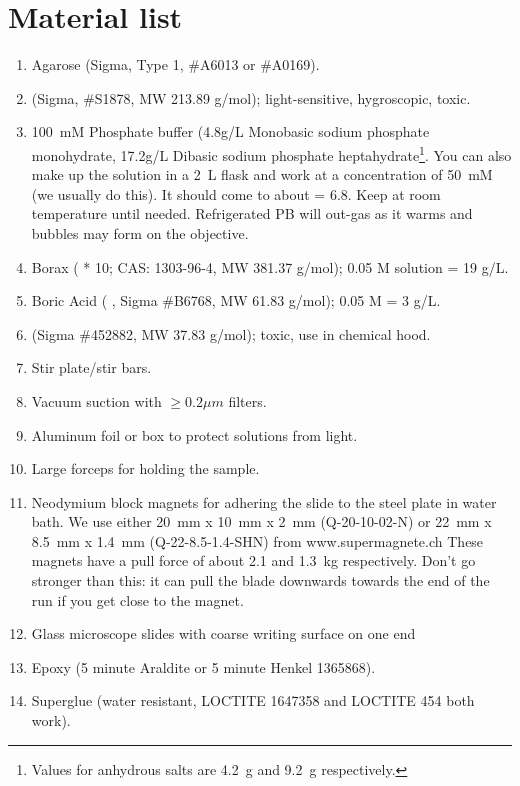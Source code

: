 \documentclass[paper=a4, fontsize=11pt]{scrartcl} %
\numberwithin{equation}{section} %
\numberwithin{figure}{section} %
\numberwithin{table}{section} %
\begin{document}
\section{Material list}
\begin{enumerate}
\item Agarose (Sigma, Type 1, \#A6013 or \#A0169).
\item {} (Sigma, \#S1878, MW 213.89 g/mol); light-sensitive, hygroscopic, toxic.
\item 100~mM Phosphate buffer (4.8g/L Monobasic sodium phosphate monohydrate, 17.2g/L Dibasic sodium phosphate heptahydrate\footnote{Values for anhydrous salts are 4.2~g and 9.2~g respectively.}. You can also make up the solution in a 2~L flask and work at a concentration of 50~mM (we usually do this). 
It should come to about \pH = 6.8.
Keep at room temperature until needed. 
Refrigerated PB will out-gas as it warms and bubbles may form on the objective. 
\item Borax ( * 10; CAS: 1303-96-4, MW 381.37 g/mol); 0.05 M solution = 19 g/L.
\item Boric Acid ( , Sigma \#B6768, MW 61.83 g/mol); 0.05 M = 3 g/L.
\item {} (Sigma \#452882, MW 37.83 g/mol); toxic, use in chemical hood.
\item Stir plate/stir bars.
\item Vacuum suction with $\ge 0.2 \mu m$ filters.
\item Aluminum foil or box to protect solutions from light. 
\item Large forceps for holding the sample. 
\item Neodymium block magnets for adhering the slide to the steel plate in water bath. 
      We use either 20~mm x 10~mm x 2~mm (Q-20-10-02-N) or 22~mm x 8.5~mm x 1.4~mm (Q-22-8.5-1.4-SHN) from www.supermagnete.ch
      These magnets have a pull force of about 2.1 and 1.3~kg respectively.
      Don't go stronger than this: it can pull the blade downwards towards the end of the run if you get close to the magnet.
\item Glass microscope slides with coarse writing surface on one end
\item Epoxy (5 minute Araldite or 5 minute Henkel 1365868).
\item Superglue (water resistant, LOCTITE 1647358 and LOCTITE 454 both work).
\end{enumerate}
\end{document}
